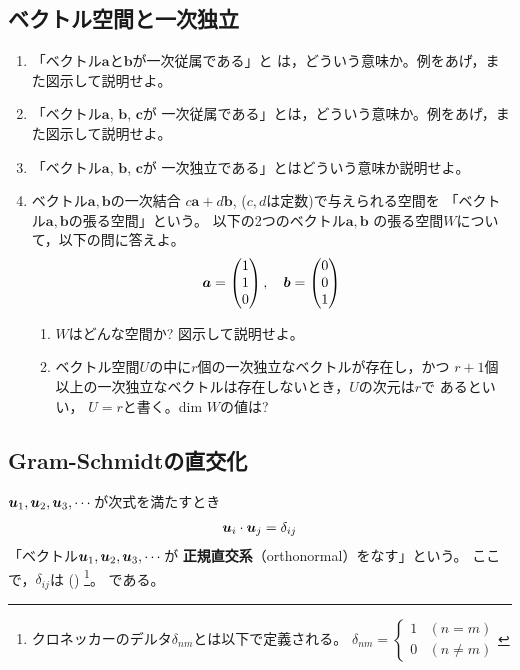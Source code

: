 \documentclass[twocolumn,11pt]{jarticle}
\begin{document}
\subsection{ベクトル空間と一次独立}
\begin{enumerate}
\item 「ベクトル$\boldsymbol{a}$と$\boldsymbol{b}$が一次従属である」と
  は，どういう意味か。例をあげ，また図示して説明せよ。
\item 「ベクトル$\boldsymbol{a}$, $\boldsymbol{b}$, $\boldsymbol{c}$が
  一次従属である」とは，どういう意味か。例をあげ，また図示して説明せよ。
\item 「ベクトル$\boldsymbol{a}$, $\boldsymbol{b}$, $\boldsymbol{c}$が
  一次独立である」とはどういう意味か説明せよ。
\item ベクトル$\boldsymbol{a},\boldsymbol{b}$の一次結合
  $c\boldsymbol{a}+d\boldsymbol{b}$, ($c,d$は定数)で与えられる空間を
  「ベクトル$\boldsymbol{a},\boldsymbol{b}$の張る空間」という。
  以下の2つのベクトル$\boldsymbol{a},\boldsymbol{b}$
  の張る空間$W$について，以下の問に答えよ。
  \begin{align}
    \boldsymbol{a}=
    \begin{pmatrix}
      1 \\ 1 \\ 0
    \end{pmatrix},\quad
    \boldsymbol{b}=
    \begin{pmatrix}
      0 \\ 0 \\ 1
    \end{pmatrix}\notag
  \end{align}
  \begin{enumerate}
  \item $W$はどんな空間か? 図示して説明せよ。 
  \item ベクトル空間$U$の中に$r$個の一次独立なベクトルが存在し，かつ
    $r+1$個以上の一次独立なベクトルは存在しないとき，$U$の次元は$r$で
    あるといい， $U=r$と書く。dim $W$の値は?
  \end{enumerate}
\end{enumerate}

\subsection{Gram-Schmidtの直交化}
$\boldsymbol{u}_1, \boldsymbol{u}_2, \boldsymbol{u}_3, \cdots$が次式を満たすとき
\begin{align}
  \boldsymbol{u}_i\cdot\boldsymbol{u}_j=\delta_{ij}
\end{align}
「ベクトル$\boldsymbol{u}_1, \boldsymbol{u}_2, \boldsymbol{u}_3, \cdots$が
\textbf{正規直交系}（orthonormal）をなす」という。
ここで，$\delta_{ij}$は
()
\footnote{
クロネッカーのデルタ$\delta_{nm}$とは以下で定義される。
$\delta_{nm}=
\begin{cases}
  1&(n=m)\\
  0 &(n\ne m)
\end{cases}
$
}。
である。
\end{document}
